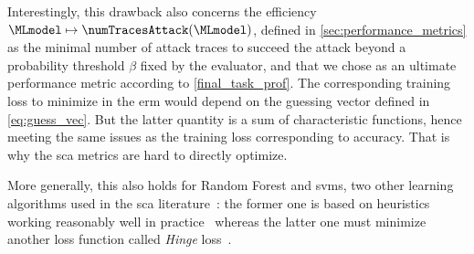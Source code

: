 Interestingly, this drawback also concerns the efficiency \(\MLmodel \mapsto \numTracesAttack(\MLmodel)\), defined in \autoref{sec:performance_metrics} as the minimal number of attack traces to succeed the attack beyond a probability threshold \(\beta\) fixed by the evaluator, and that we chose as an ultimate performance metric according to \autoref{final_task_prof}.
The corresponding training loss to minimize in the \gls{erm} would depend on the guessing vector defined in \autoref{eq:guess_vec}.
But the latter quantity is a sum of characteristic functions, hence meeting the same issues as the training loss corresponding to accuracy.
That is why the \gls{sca} metrics are hard to directly optimize.

More generally, this also holds for Random Forest and \glspl{svm}, two other learning algorithms used in the \gls{sca} literature~\cite{picek_curse_2019}: the former one is based on heuristics working reasonably well in practice~\cite[Chap.~18.2]{shalev-shwartz_understanding_2014} whereas the latter one must minimize another loss function called \emph{Hinge} loss~\cite[Chap.~15.2.3]{shalev-shwartz_understanding_2014}.

